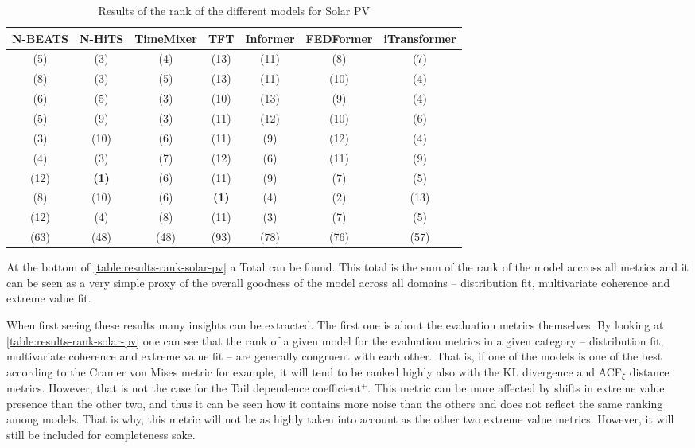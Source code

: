 \begin{table}[ht]
    \footnotesize
    \begin{flushright}
    \begin{tabular}[r]{|ccc|cccc}
        \toprule
        N-BEATS&N-HiTS&TimeMixer&TFT&Informer&FEDFormer&iTransformer \\
        \midrule            
        (5)&(3)&(4)&(13)&(11)&(8)&(7) \\
        (8)&(3)&(5)&(13)&(11)&(10)&(4) \\
        (6)&(5)&(3)&(10)&(13)&(9)&(4) \\
        \midrule
        (5)&(9)&(3)&(11)&(12)&(10)&(6) \\
        (3)&(10)&(6)&(11)&(9)&(12)&(4) \\
        (4)&(3)&(7)&(12)&(6)&(11)&(9) \\
        \midrule
        (12)&\textbf{(1)}&(6)&(11)&(9)&(7)&(5) \\
        (8)&(10)&(6)&\textbf{(1)}&(4)&(2)&(13) \\
        (12)&(4)&(8)&(11)&(3)&(7)&(5) \\
        \bottomrule
        (63)&(48)&(48)&(93)&(78)&(76)&(57) \\
        \bottomrule
    \end{tabular}
    \end{flushright}
    \caption{Results of the rank of the different models for Solar PV\label{long}}
    \label{table:results-rank-solar-pv}
\end{table}

At the bottom of \autoref{table:results-rank-solar-pv} a Total can be found. This total is the sum of the rank of the model accross all metrics and it can be seen as a very simple proxy of the overall goodness of the model across all domains -- distribution fit, multivariate coherence and extreme value fit. 

When first seeing these results many insights can be extracted. The first one is about the evaluation metrics themselves. By looking at \autoref{table:results-rank-solar-pv} one can see that the rank of a given model for the evaluation metrics in a given category -- distribution fit, multivariate coherence and extreme value fit -- are generally congruent with each other. That is, if one of the models is one of the best according to the Cramer von Mises metric for example, it will tend to be ranked highly also with the KL divergence and ACF$_\xi$ distance metrics. However, that is not the case for the Tail dependence coefficient$^+$. This metric can be more affected by shifts in extreme value presence than the other two, and thus it can be seen how it contains more noise than the others and does not reflect the same ranking among models. That is why, this metric will not be as highly taken into account as the other two extreme value metrics. However, it will still be included for completeness sake. 

